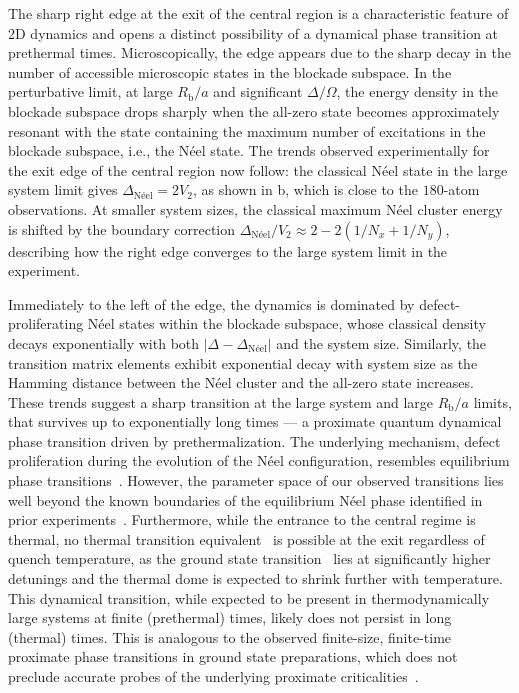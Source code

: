 \documentclass[english,floatfix,twocolumn,showpacs, aps, prx, reprint, superscriptaddress, longbibliography]{revtex4-2}
\begin{document}
The sharp right edge at the exit of the central region is a characteristic feature of 2D dynamics and opens a distinct possibility of a dynamical phase transition at prethermal times. Microscopically, the edge appears due to the sharp decay in the number of accessible microscopic states in the blockade subspace. In the perturbative limit, at large $R_\mathrm{b} / a$ and significant $\Delta/\Omega$, the energy density in the blockade subspace drops sharply when the all-zero state becomes approximately resonant with the state containing the maximum number of excitations in the blockade subspace, i.e., the N{\'e}el state. The trends observed experimentally for the exit edge of the central region now follow: the classical N{\'e}el state in the large system limit gives $\Delta_{\text{N{\'e}el}} = 2 V_2$, as shown in b, which is close to the $180$-atom observations. At smaller system sizes, the classical maximum N{\'e}el cluster energy is shifted by the boundary correction $\Delta_{\text{N{\'e}el}} / V_2 \approx 2 - 2(1/N_x + 1/N_y)$, describing how the right edge converges to the large system limit in the experiment.

Immediately to the left of the edge, the dynamics is dominated by defect-proliferating N{\'e}el states within the blockade subspace, whose classical density decays exponentially with both $|\Delta - \Delta_{\text{N{\'e}el}}|$ and the system size. Similarly, the transition matrix elements exhibit exponential decay with system size as the Hamming distance between the N{\'e}el cluster and the all-zero state increases. These trends suggest a sharp transition at the large system and large $R_\mathrm{b}/a$ limits, that survives up to exponentially long times --- a proximate quantum dynamical phase transition driven by prethermalization. The underlying mechanism, defect proliferation during the evolution of the N{\'e}el configuration, resembles equilibrium phase transitions~\cite{Sachdev:2011}. However, the parameter space of our observed transitions lies well beyond the known boundaries of the equilibrium N{\'e}el phase identified in prior experiments~\cite{Ebadi:2021}. Furthermore, while the entrance to the central regime is thermal, no thermal transition equivalent~\cite{Halimeh:2017, Zunkovic:2018} is possible at the exit regardless of quench temperature, as the ground state transition~\cite{Ebadi:2021} lies at significantly higher detunings and the thermal dome is expected to shrink further with temperature. This dynamical transition, while expected to be present in thermodynamically large systems at finite (prethermal) times, likely does not persist in long (thermal) times. This is analogous to the observed finite-size, finite-time proximate phase transitions in ground state preparations, which does not preclude accurate probes of the underlying proximate criticalities~\cite{Keesling:2019, Ebadi:2021}.
\end{document}
